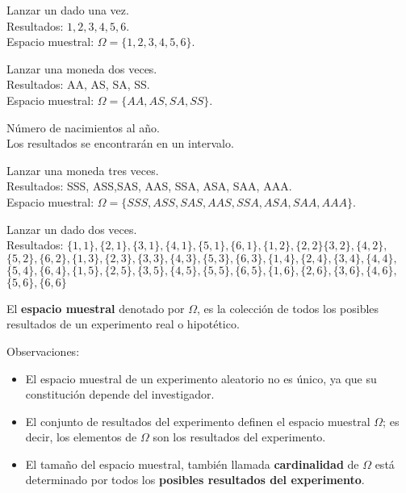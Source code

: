 \begin{example}
Lanzar un dado una vez. \\
Resultados: $1,2,3,4,5,6$. \\
Espacio muestral: $\Omega=\{1,2,3,4,5,6\}$.\\   
\end{example}

\begin{example}
Lanzar una moneda dos veces. \\
Resultados: AA, AS, SA, SS.\\ 
Espacio muestral: $\Omega=\{AA,AS,SA,SS\}$.\\    
\end{example} 

\begin{example}
Número de nacimientos al año.\\
Los resultados se encontrarán en un intervalo.   
\end{example}
\begin{example}
Lanzar una moneda tres veces.\\
Resultados: SSS, ASS,SAS, AAS, SSA, ASA, SAA, AAA. \\
Espacio muestral: $\Omega=\{ SSS, ASS, SAS, AAS, SSA, ASA, SAA, AAA\}$.\\
\end{example}

\begin{example}
 Lanzar un dado dos veces.\\
Resultados: 
$\{1,1\}, \{2,1\}, \{3,1\},\{4,1\},\{5,1\},\{6,1\},\{1,2\},\{2,2\}\{3,2\},\{4,2\},$
$\{5,2\},\{6,2\},\{1,3\},\{2,3\},\{3,3\},\{4,3\},\{5,3\},\{6,3\},\{1,4\},\{2,4\},
\{3,4\},\{4,4\},$
$\{5,4\},\{6,4\},\{1,5\},\{2,5\},\{3,5\},\{4,5\},\{5,5\},\{6,5\},\{1,6\},\{2,6\},\{3,6\},\{4,6\},$
$\{5,6\},\{6,6\}$   
\end{example}


\begin{definition}
El \textbf{espacio muestral} denotado por $\Omega$, es la colección de todos los posibles resultados de un experimento
real o hipotético.
\end{definition}

Observaciones:
\begin{itemize}
\item  El espacio muestral de un experimento aleatorio no es único, ya que su constitución depende del investigador.
\item  El conjunto de resultados del experimento definen el espacio muestral $\Omega$; es decir, los elementos de $\Omega$ son los resultados del experimento.
\item  El tamaño del espacio muestral, también llamada \textbf{cardinalidad} de $\Omega$ está determinado por todos los  \textbf{posibles resultados del experimento}.
\end{itemize}

